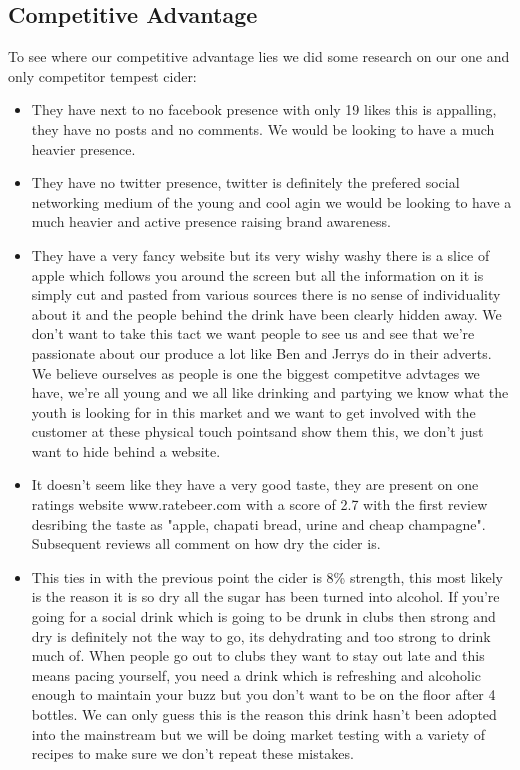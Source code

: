 \documentclass[11pt]{article}
\begin{document}
  \subsection{Competitive Advantage}
To see where our competitive advantage lies we did some research on our one and
only competitor tempest cider:

\begin{itemize}
	\item They have next to no facebook presence with only 19 likes this is
appalling, they have no posts and no comments. We would be looking to have a
much heavier presence.
	\item They have no twitter presence, twitter is definitely the prefered social
networking medium of the young and cool agin we would be looking to have a much
heavier and active presence raising brand awareness.
	\item They have a very fancy website but its very wishy washy there is a slice
of apple which follows you around the screen but all the information on it is
simply cut and pasted from various sources there is no sense of individuality
about it and the people behind the drink have been clearly hidden away. We don't
want to take this tact we want people to see us and see that we're passionate
about our produce a lot like Ben and Jerrys do in their adverts. We believe
ourselves as people is one the biggest competitve advtages we have, we're all
young and we all like drinking and partying we know what the youth is looking
for in this market and we want to get involved with the customer at these
physical touch pointsand show them this, we don't just want to hide behind a
website. 
	\item It doesn't seem like they have a very good taste, they are present on
one ratings website www.ratebeer.com with a score of 2.7 with the first review
desribing the taste as "apple, chapati bread, urine and cheap champagne".
Subsequent reviews all comment on how dry the cider is.
	\item This ties in with the previous point the cider is 8\% strength, this
most likely is the reason it is so dry all the sugar has been turned into
alcohol. If you're going for a social drink which is going to be drunk in clubs
then strong and dry is definitely not the way to go, its dehydrating and too
strong to drink much of. When people go out to clubs they want to stay out late
and this means pacing yourself, you need a drink which is refreshing and
alcoholic enough to maintain your buzz but you don't want to be on the floor
after 4 bottles. We can only guess this is the reason this drink hasn't been
adopted into the mainstream but we will be doing market testing with a variety
of recipes to make sure we don't repeat these mistakes.
\end{itemize}
\newpage
\end{document}
